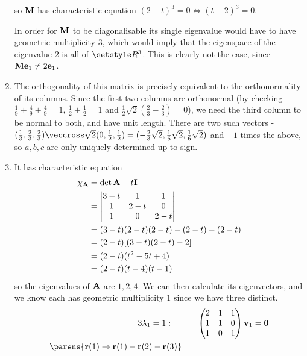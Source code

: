 \documentclass[fleqn,a4paper,11pt]{article}
\begin{document}
\begin{enumerate}[label=\textbf{\arabic*.}]
   so \(\mathbf{M}\) has characteristic equation
   \((2 - t)^3 = 0 \iff (t - 2)^3 = 0\).

   In order for \(\mathbf{M}\) to be diagonalisable its single eigenvalue would have
   to have geometric multiplicity \(3\), which would imply that the eigenspace
   of the eigenvalue \(2\) is all of \(\Reals^3\). This is clearly not the
   case, since \(\mathbf{M} \mathrm{\mathbf{e}}_1 \ne 2\mathrm{\mathbf{e}}_1\).
  \item
   The orthogonality of this matrix is precisely equivalent to the
   orthonormality of its columns. Since the first two columns are orthonormal
   (by checking \(\frac 19 + \frac 49 + \frac 49 = 1\),
   \(\frac 12 + \frac 12 = 1\) and
   \(\frac 12 \sqrt 2(\frac 23 - \frac 23) = 0\)), we need the third column to
   be normal to both, and have unit length. There are two such vectors -
   \((\frac 13, \frac 23, \frac 23) \veccross \sqrt 2(0, \frac 12, \frac 12)
     = (-\frac 23 \sqrt 2, \frac 16 \sqrt 2, \frac 16 \sqrt 2)\)
   and \(-1\) times the above, so \(a, b, c\) are only uniquely determined up to
   sign.
  \item
   It has characteristic equation
   \begin{align*}
    \chi_{\mathbf{A}}
     &= \det{\mathbf{A} - t \mathbf{I}} \\
     &=
     \begin{vmatrix}
      3 - t & 1 & 1 \\
      1 & 2 - t & 0 \\
      1 & 0 & 2 - t
     \end{vmatrix} \\
    &= (3 - t)(2 - t)(2 - t) - (2 - t) - (2 - t) \\
    &= (2 - t)[(3 - t)(2 - t) - 2] \\
    &= (2 - t)(t^2 - 5t + 4) \\
    &= (2 - t)(t - 4)(t - 1)
   \end{align*}
   so the eigenvalues of \(\mathbf{A}\) are \(1, 2, 4\). We can then calculate its
   eigenvectors, and we know each has geometric multiplicity \(1\) since we have
   three distinct.
   \begin{alignat*}3
    \lambda_1 = 1:\quad{}&& &&
    \begin{pmatrix}
     2 & 1 & 1 \\
     1 & 1 & 0 \\
     1 & 0 & 1
    \end{pmatrix}
    \vec v_1 &= \vec 0 \\
    \parens{
     \vec r(1) \to \vec r(1) - \vec r(2) - \vec r(3)
}
\end{alignat*}
\end{enumerate}
\end{document}

